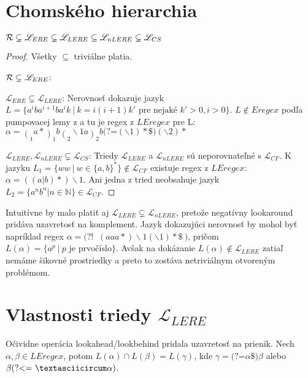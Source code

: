\documentclass{svk_long_sk}
\def\R{{\cal R}} %
\def\L{\mathscr{L}} %
\def\N{\mathds{N}} %
\def\e{Eregex}
\def\le{LEregex}
\def\el{\mathscr{L}_{ERE}}
\def\lel{\mathscr{L}_{LERE}}
\def\nlel{\mathscr{L}_{nLERE}}
\def\lookahead{\text{(?=}}
\def\nlookahead{\text{(?!~}}
\def\lookbehind{\text{(?\textless =}}
\begin{document}
\section{Chomského hierarchia}
\begin{theorem}
$\R \subsetneq \el \subsetneq \lel \subseteq \nlel \subsetneq \L_{CS}$
\end{theorem}
\begin{proof}

Všetky $\subseteq$ triviálne platia.

$\R \subsetneq \el$: \cite{ExtendedRegexPower}

$\el \subsetneq \lel$: Nerovnosť dokazuje jazyk $L=\lbrace a^iba^{i+1}ba^ik ~|~ k=i(i+1)k' \text{ pre nejaké } k'>0,i>0\rbrace$. $L\notin\e$ podľa pumpovacej lemy z \cite{ExtendedRegexIntersec} a tu je regex z $\le$ pre L: 
$\alpha=\displaystyle{\mathop{(}_1 a*\mathop{)}_1 b \mathop{(}_2 \backslash 1 a \mathop{)}_2 b \lookahead (\backslash 1) *\$ ) (\backslash 2)* }$

$\lel,\nlel \subsetneq \L_{CS}$: Triedy $\lel$ a $\nlel$ sú neporovnateľné s $\L_{CF}$. K jazyku $L_1=\lbrace ww~|~w\in \lbrace a,b \rbrace^*\rbrace \notin \L_{CF}$ existuje regex z $\le$: $\alpha= ((a|b)*)\backslash 1$. Ani jedna z tried neobsahuje jazyk $L_2=\lbrace a^nb^n|n\in\N\rbrace \in \L_{CF}$.
\end{proof}

Intuitívne by malo platiť aj $\lel \subsetneq \nlel$, pretože negatívny lookaround pridáva uzavretosť na komplement. Jazyk dokazujúci nerovnosť by mohol byť napríklad regex $\alpha =\nlookahead ~(aaa*)\backslash 1(\backslash 1)* \$~)$, pričom $L(\alpha)= \lbrace a^p ~|~ p \text{ je prvočíslo} \rbrace$. Avšak na dokázanie $L(\alpha)\notin\lel$ zatiaľ nemáme šikovné prostriedky a preto to zostáva netriviálnym otvoreným problémom.

\section{Vlastnosti triedy $\lel$}

Očividne operácia lookahead/lookbehind pridala uzavretosť na prienik. Nech $\alpha,\beta\in\le$, potom $L(\alpha)\cap L(\beta) = L(\gamma)$, kde $\gamma = \lookahead \alpha \$)\beta$ alebo $\beta \lookbehind ~\textasciicircum \alpha)$.
\end{document}
